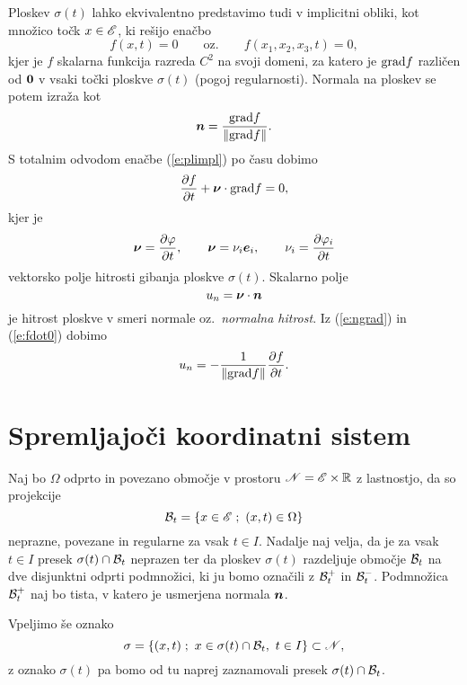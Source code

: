 Ploskev $\sigma(t)$ lahko ekvivalentno predstavimo tudi v 
implicitni obliki, kot množico točk $x\in\mathscr E$, ki rešijo enačbo
\begin{equation} \label{e:plimpl}
	f(x,t)=0\qquad\textrm{oz.}\qquad f(x_1,x_2,x_3,t)=0,
\end{equation}
kjer je $f$ skalarna funkcija razreda $C^2$ na svoji domeni,
za katero je $\mathrm{grad} f$ različen od $\boldsymbol 0$ v vsaki točki ploskve $\sigma(t)$
(pogoj regularnosti). Normala na ploskev se potem izraža kot
\begin{equation} \label{e:ngrad}
	\boldsymbol n=\frac{\mathrm{grad} f}{\|\mathrm{grad} f\|}.
\end{equation}
S totalnim odvodom enačbe (\ref{e:plimpl}) po času dobimo
\begin{equation} \label{e:fdot0}
	\frac{\partial f}{\partial t}+\boldsymbol \nu\cdot\mathrm{grad} f = 0,
\end{equation}
kjer je
\begin{equation} \label{e:nu}
	\boldsymbol \nu=\frac{\partial\varphi}{\partial t},\qquad
	\boldsymbol \nu=\nu_i\boldsymbol e_i,\qquad \nu_i=\frac{\partial\varphi_i}{\partial t}
\end{equation}
vektorsko polje hitrosti gibanja ploskve $\sigma(t)$. Skalarno polje
\begin{equation} \label{e:un}
	u_n=\boldsymbol \nu\cdot\boldsymbol n
\end{equation}
je hitrost ploskve v smeri normale oz.~\emph{normalna hitrost}.
Iz (\ref{e:ngrad}) in (\ref{e:fdot0}) dobimo
\[ u_n=-\frac{1}{\|\mathrm{grad} f\|}\frac{\partial f}{\partial t}. \]


\section{Spremljajoči koordinatni sistem}


Naj bo $\Omega$ odprto in povezano območje v prostoru $\mathscr N=\mathscr E\times\mathbb R$ z lastnostjo, da so projekcije
\[ \B_t=\{x\in\E\;;\ (x,t)\in\Omega\} \]
neprazne, povezane in regularne za vsak $t\in I$. Nadalje naj velja, da je za vsak $t\in I$
presek $\sigma(t)\cap\mathcal B_t$ neprazen ter da ploskev $\sigma(t)$ razdeljuje območje
$\mathcal B_t$ na dve disjunktni odprti podmnožici, ki ju bomo označili z $\mathcal B_t^+$ in $\mathcal B_t^-$.
Podmnožica $\mathcal B_t^+$ naj bo tista, v katero je usmerjena normala $\boldsymbol n$.

Vpeljimo še oznako
\[
	\sigma=\{(x,t)\;;\ x\in\sigma(t)\cap \B_t,\ t\in I\}\subset\N,
\]
z oznako $\sigma(t)$ pa bomo od tu naprej zaznamovali presek $\sigma(t)\cap\mathcal B_t$.

